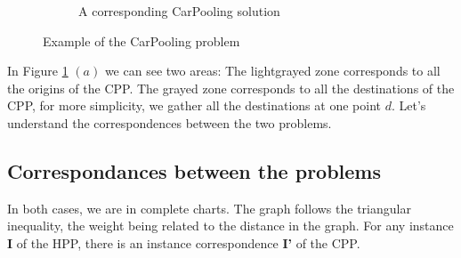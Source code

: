 \documentclass[12pt, a4paper,twoside]{memoir}
\newcommand{\newpar}{\vskip 0.2in \noindent}
\newcommand\tab[1][1cm]{\hspace*{#1}}
\begin{document}
\begin{figure}[H]
\begin{subfigure}{.5\textwidth}
			\caption{A corresponding CarPooling solution}
		\end{subfigure}
		\caption{Example of the CarPooling problem}
		\label{fig:Example of the CarPooling problem}
	\end{figure}
	
	\noindent In Figure \ref{fig:Example of the CarPooling problem} $(a)$ we can see two areas: \newline
	\tab The lightgrayed zone corresponds to all the origins of the CPP.\newline
	\tab The grayed zone corresponds to all the destinations of the CPP, for more simplicity, we gather all the destinations at one point $d$.
	\newpar
	Let's understand the correspondences between the two problems.
	
	\subsection{Correspondances between the problems}
	
	In both cases, we are in complete charts. The graph follows the triangular inequality, the weight being related to the distance in the graph. \newline
	For any instance \textbf{I} of the HPP, there is an instance correspondence \textbf{I'} of the CPP.
	
\end{document}
